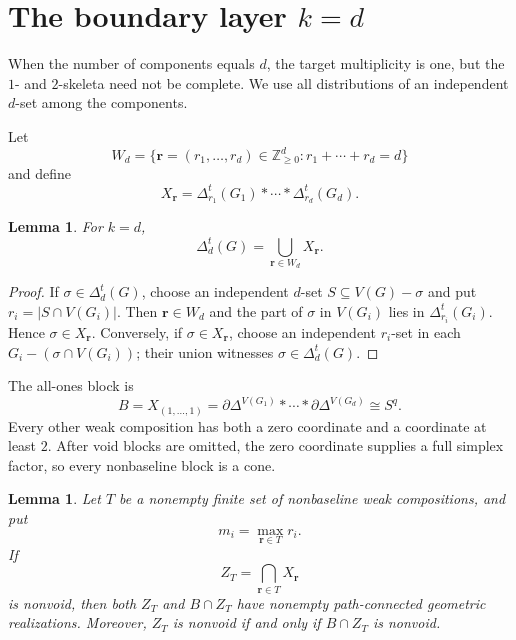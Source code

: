 \documentclass[11pt]{article}
\newtheorem{lemma}[theorem]{Lemma}
\theoremstyle{remark}
\numberwithin{equation}{section}
\begin{document}
\section{The boundary layer \texorpdfstring{$k=d$}{k=d}}\label{sec:k-equals-d}

When the number of components equals $d$, the target multiplicity is one, but
the $1$- and $2$-skeleta need not be complete. We use all distributions of an
independent $d$-set among the components.

Let
\begin{equation}
W_d=\{\mathbf r=(r_1,\ldots,r_d)\in\mathbb Z_{\geq0}^d:
r_1+\cdots+r_d=d\}
\label{eq:weak-compositions}
\end{equation}
and define
\begin{equation}
X_{\mathbf r}
=\Delta_{r_1}^t(G_1)*\cdots*\Delta_{r_d}^t(G_d).
\label{eq:weak-composition-block}
\end{equation}

\begin{lemma}\label{lem:weak-composition-cover}
For $k=d$,
\begin{equation}
\Delta_d^t(G)=\bigcup_{\mathbf r\in W_d}X_{\mathbf r}.
\label{eq:weak-composition-cover}
\end{equation}
\end{lemma}

\begin{proof}
If $\sigma\in\Delta_d^t(G)$, choose an independent $d$-set
$S\subseteq V(G)-\sigma$ and put $r_i=|S\cap V(G_i)|$. Then
$\mathbf r\in W_d$ and the part of $\sigma$ in $V(G_i)$ lies in
$\Delta_{r_i}^t(G_i)$. Hence $\sigma\in X_{\mathbf r}$. Conversely, if
$\sigma\in X_{\mathbf r}$, choose an independent $r_i$-set in each
$G_i-(\sigma\cap V(G_i))$; their union witnesses
$\sigma\in\Delta_d^t(G)$.
\end{proof}

The all-ones block is
\begin{equation}
B=X_{(1,\ldots,1)}
=\partial\Delta^{V(G_1)}*\cdots*\partial\Delta^{V(G_d)}
\cong S^q.
\label{eq:baseline-sphere}
\end{equation}
Every other weak composition has both a zero coordinate and a coordinate at
least $2$. After void blocks are omitted, the zero coordinate supplies a full
simplex factor, so every nonbaseline block is a cone.

\begin{lemma}\label{lem:connected-traces}
Let $T$ be a nonempty finite set of nonbaseline weak compositions, and put
\[
m_i=\max_{\mathbf r\in T}r_i.
\]
If
\[
Z_T=\bigcap_{\mathbf r\in T}X_{\mathbf r}
\]
is nonvoid, then both $Z_T$ and $B\cap Z_T$ have nonempty path-connected
geometric realizations. Moreover, $Z_T$ is nonvoid if and only if
$B\cap Z_T$ is nonvoid.
\end{lemma}
\end{document}
